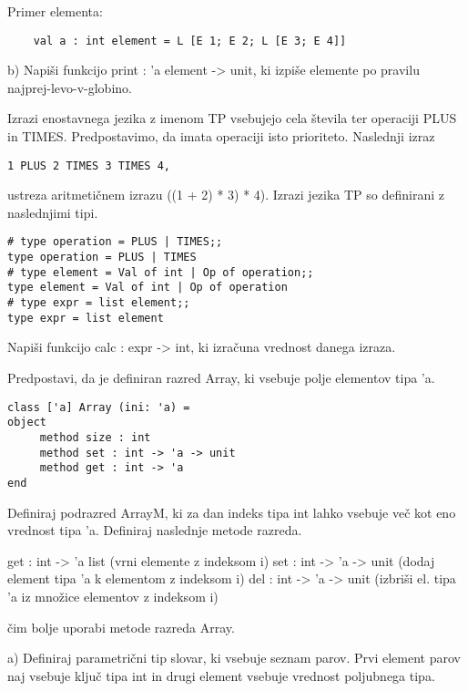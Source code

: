 \begin{ex}
    Primer elementa: 
\begin{verbatim}
    val a : int element = L [E 1; E 2; L [E 3; E 4]]
\end{verbatim}

b) Napi\v si funkcijo print : 'a element -> unit, ki izpi\v se elemente po pravilu                          
    najprej-levo-v-globino.



\end{ex} \begin{ex}
Izrazi enostavnega jezika z imenom TP vsebujejo cela \v stevila ter operaciji PLUS in TIMES. Predpostavimo, da imata operaciji isto prioriteto. Naslednji izraz
\begin{verbatim}
1 PLUS 2 TIMES 3 TIMES 4,
\end{verbatim}
ustreza aritmeti\v cnem izrazu ((1 + 2) * 3) * 4). Izrazi jezika TP so definirani z naslednjimi tipi. 
 
\begin{verbatim}
# type operation = PLUS | TIMES;; 
type operation = PLUS | TIMES 
# type element = Val of int | Op of operation;; 
type element = Val of int | Op of operation
# type expr = list element;;
type expr = list element

\end{verbatim}
Napi\v si funkcijo calc : expr -> int, ki izra\v cuna vrednost danega izraza.  


\end{ex} \begin{ex}
Predpostavi, da je definiran razred Array, ki vsebuje polje elementov tipa 'a. 

\begin{verbatim}
class ['a] Array (ini: 'a) =
object 
     method size : int
     method set : int -> 'a -> unit
     method get : int -> 'a
end
\end{verbatim}
Definiraj podrazred ArrayM, ki za dan indeks tipa int lahko vsebuje ve\v c kot eno vrednost tipa 'a.  Definiraj naslednje metode razreda. 

get : int -> 'a list             (vrni elemente z indeksom i) 
set : int -> 'a -> unit    (dodaj element tipa 'a k elementom z indeksom i)
del : int -> 'a -> unit   (izbri\v si el. tipa 'a iz mno\v zice elementov z indeksom i)

\v cim bolje uporabi metode razreda Array. 


\end{ex} \begin{ex}
a) Definiraj parametri\v cni tip slovar, ki vsebuje seznam parov. Prvi element parov naj vsebuje klju\v c tipa int in drugi element vsebuje vrednost poljubnega tipa. 


\end{ex}
